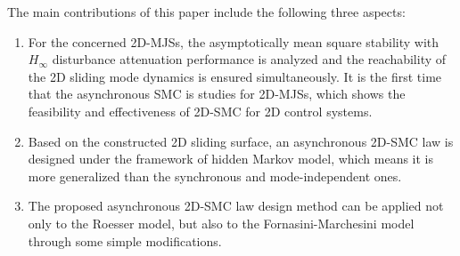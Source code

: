 \documentclass[conference]{IEEEtran}
\begin{document}
	 
	The main contributions of this paper include the following three aspects:
	\begin{enumerate}
		\item  For the concerned 2D-MJSs, the asymptotically mean square stability with $H_{\infty}$ disturbance attenuation  performance is analyzed and the reachability of the 2D sliding mode dynamics is ensured simultaneously. It is the first time that the asynchronous SMC is studies for 2D-MJSs, which shows the feasibility and effectiveness of 2D-SMC for 2D control systems.
		\item   Based on the constructed 2D sliding surface, an asynchronous 2D-SMC law is designed under the framework of hidden Markov model, which means it is more generalized than the synchronous and mode-independent ones.
		\item  The proposed asynchronous 2D-SMC law design method can be applied not only to the Roesser model, but also to the  Fornasini-Marchesini  model through some simple modifications.
	\end{enumerate}
\end{document}
